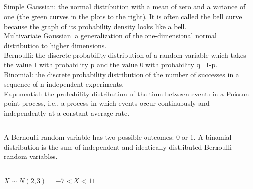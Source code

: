 \documentclass[a4paper]{article}
\begin{document}
\subsection{}
Simple Gaussian: the normal distribution with a mean of zero and a variance of one (the green curves in the plots to the right). It is often called the bell curve because the graph of its probability density looks like a bell. \\

Multivariate Gaussian: a generalization of the one-dimensional normal distribution to higher dimensions. \\

Bernoulli: the discrete probability distribution of a random variable which takes the value 1 with probability p and the value 0 with probability q=1-p. \\

Binomial: the discrete probability distribution of the number of successes in a sequence of n independent experiments. \\

Exponential: the probability distribution of the time between events in a Poisson point process, i.e., a process in which events occur continuously and independently at a constant average rate.

\subsection{}
A Bernoulli random variable has two possible outcomes: 0 or 1. A binomial distribution is the sum of independent and identically distributed Bernoulli random variables.

\subsection{}
$X \sim N(2,3) = -7<X<11$

\subsection{}
\subsection{}
\end{document}
